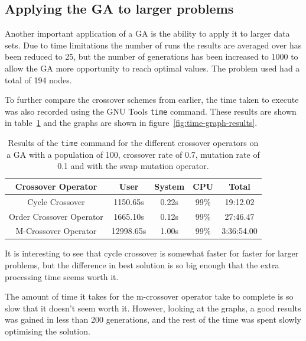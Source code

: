 \documentclass[10pt, a4paper]{article}
\begin{document}
\subsection{Applying the GA to larger problems}

Another important application of a GA is the ability to apply it to larger data
sets. Due to time limitations the number of runs the results are averaged over
has been reduced to 25, but the number of generations has been increased to 
1000 to allow the GA more opportunity to reach optimal values. The problem used
had a total of 194 nodes.

To further compare the crossover schemes from earlier, the time taken to
execute was also recorded using the GNU Tools \texttt{time} command. These
results are shown in table~\ref{tab:time-results} and the graphs are shown in
figure~\ref{fig:time-graph-results}.

\begin{table}[h]
\centering
\begin{tabular}{|c|c|c|c|c|} \hline
\textbf{Crossover Operator}	& \textbf{User}	&\textbf{System}&\textbf{CPU}	& \textbf{Total} \\ \hline
Cycle Crossover			& 1150.65s	& 0.22s		& 99\%		& 19:12.02 \\ \hline
Order Crossover Operator	& 1665.10s	& 0.12s		& 99\%		& 27:46.47 \\ \hline
M-Crossover Operator		& 12998.65s	& 1.00s		& 99\%		& 3:36:54.00\\ \hline
\end{tabular}
\caption{Results of the \texttt{time} command for the different crossover
         operators on a GA with a population of 100, crossover rate of 0.7,
         mutation rate of 0.1 and with the swap mutation operator.}
\label{tab:time-results}
\end{table}

It is interesting to see that cycle crossover is somewhat faster for faster for
larger problems, but the difference in best solution is so big enough that the
extra processing time seems worth it.

The amount of time it takes for the m-crossover operator take to complete is so
slow that it doesn't seem worth it. However, looking at the graphs, a good
results was gained in less than 200 generations, and the rest of the time was
spent slowly optimising the solution.
\end{document}
